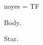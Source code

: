 \documentclass{report}
\makeatletter
\edef\lxams{\ifx\symAMSb\undefined no\else yes\fi}
\edef\lxtp{\if@titlepage T\else F\fi}
\makeatother
\begin{document}
\@chapapp{} \appendix\@chapapp{} \lxams{} \lxx{} \@tempa=\@tempc{} \lxy{} \lxtp
\begin{thm}Body.\end{thm}
\begin{thm*}Star.\end{thm*}
\end{document}
